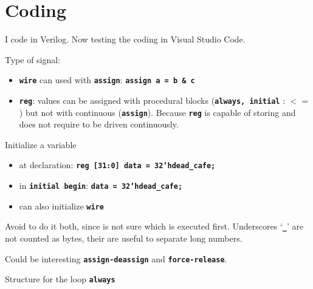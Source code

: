 \documentclass[a4paper,10pt,twoside]{article}
\newcommand{\0}{\textbf{0}}
\newcommand{\1}{\textbf{1}}
\newcommand{\code}[1]{{\color{Mulberry}\textbf{\texttt{#1}}}}
\begin{document}
\section{Coding}
    I code in Verilog. Now testing the coding in Visual Studio Code.

    Type of signal:
    \begin{itemize}
        \item \code{wire} can used with \code{assign}: \code{assign a = b \& c}
        \item \code{reg}: values can be assigned with procedural blocks (\code{always, initial} : $<=$) but not with continuous (\code{assign}). Because \code{reg} is capable of storing and does not require to be driven continuously.
    \end{itemize}

    \noindent 
    Initialize a variable
    \begin{itemize}
        \item at declaration: \code{reg [31:0] data = 32'hdead\_cafe;}
        \item in \code{initial begin}: \code{data = 32'hdead\_cafe;}
        \item can also initialize \code{wire}
    \end{itemize}
    Avoid to do it both, since is not sure which is executed first. Underscores `\code{\_}' are not counted as bytes, their are useful to separate long numbers.

    Could be interesting \code{assign-deassign} and \code{force-release}.

    \vspace{30pt}

    Structure for the loop \code{always}

    
\end{document}
